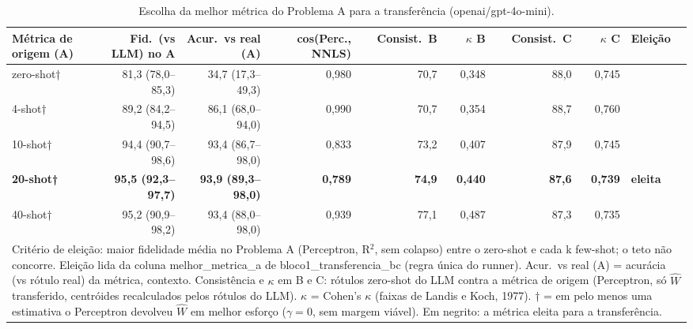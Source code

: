 \begin{table}[htbp]
\centering
\small
\caption{Escolha da melhor métrica do Problema A para a transferência (openai/gpt-4o-mini).}
\label{tab:T7_escolha_gpt4mini}
\begin{tabular}{lrrrrrrrl}
\toprule
Métrica de origem (A) & Fid.\ (vs LLM) no A & Acur.\ vs real (A) & cos(Perc., NNLS) & Consist.\ B & $\kappa$ B & Consist.\ C & $\kappa$ C & Eleição \\
\midrule
zero-shot† & 81,3 (78,0–85,3) & 34,7 (17,3–49,3) & 0,980 & 70,7 & 0,348 & 88,0 & 0,745 &  \\
4-shot† & 89,2 (84,2–94,5) & 86,1 (68,0–94,0) & 0,990 & 70,7 & 0,354 & 88,7 & 0,760 &  \\
10-shot† & 94,4 (90,7–98,6) & 93,4 (86,7–98,0) & 0,833 & 73,2 & 0,407 & 87,9 & 0,745 &  \\
\textbf{20-shot†} & \textbf{95,5 (92,3–97,7)} & \textbf{93,9 (89,3–98,0)} & \textbf{0,789} & \textbf{74,9} & \textbf{0,440} & \textbf{87,6} & \textbf{0,739} & \textbf{eleita} \\
40-shot† & 95,2 (90,9–98,2) & 93,4 (88,0–98,0) & 0,939 & 77,1 & 0,487 & 87,3 & 0,735 &  \\
\bottomrule
\multicolumn{9}{p{0.95\linewidth}}{\footnotesize Critério de eleição: maior fidelidade média no Problema A (Perceptron, R$^2$, sem colapso) entre o zero-shot e cada k few-shot; o teto não concorre. Eleição lida da coluna melhor\_metrica\_a de bloco1\_transferencia\_bc (regra única do runner). Acur.\ vs real (A) = acurácia (vs rótulo real) da métrica, contexto. Consistência e $\kappa$ em B e C: rótulos zero-shot do LLM contra a métrica de origem (Perceptron, só $\hat{W}$ transferido, centróides recalculados pelos rótulos do LLM). $\kappa$ = Cohen's $\kappa$ (faixas de Landis e Koch, 1977). † = em pelo menos uma estimativa o Perceptron devolveu $\hat{W}$ em melhor esforço ($\gamma = 0$, sem margem viável). Em negrito: a métrica eleita para a transferência.} \\
\end{tabular}
\end{table}
